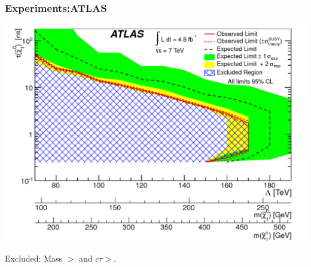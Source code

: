 \documentclass{beamer}
\begin{document}
\begin{frame}
\frametitle{\Huge{Experiments:ATLAS}}
\begin{minipage}[t]{\paperwidth}
 \begin{tcolorbox}[colback=UNL@Cream!5,colframe=UNL@Cream!40,title=\textcolor{UMN@Maroon}{\textbf{ATLAS}}]
  \includegraphics[height=0.50\textwidth,width=0.90\linewidth]{THESISPLOTS/ATLAS_Upper_Limit.png}
  \end{tcolorbox}
 
 Excluded: Mass $>  $ and $c\tau >  $.
\end{minipage}
\end{frame}
\end{document}
